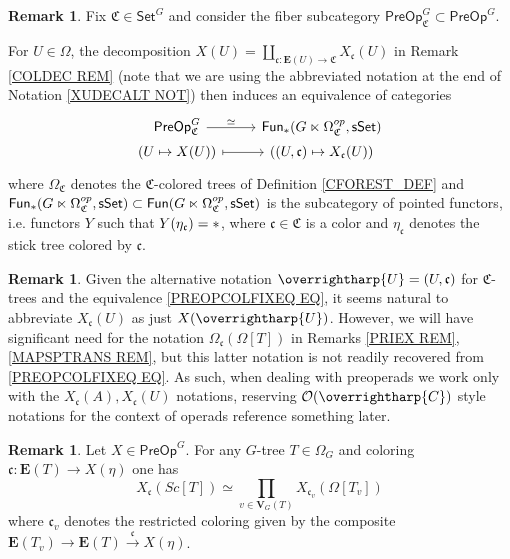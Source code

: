 \documentclass[a4paper,10pt
,draft
]{article}%
\numberwithin{equation}{section}
\numberwithin{figure}{section}
\theoremstyle{definition} %
\newtheorem{remark}[equation]{Remark}%
\newcommand{\vect}[1]{\text{\overrightharp{\ensuremath{#1}}}}
\renewcommand{\O}{\ensuremath{\mathcal O}}
\newcommand{\1}{\ensuremath{\mathbbm 1}}%
\begin{document}
\begin{remark}
	Fix $\mathfrak{C} \in \mathsf{Set}^G$
	and consider the fiber subcategory 
	$\mathsf{PreOp}^G_{\mathfrak{C}} \subset \mathsf{PreOp}^G$.
	
	For $U \in \Omega$, the decomposition
	$X(U) = \coprod_{\mathfrak{c} \colon \boldsymbol{E}(U) \to \mathfrak{C}} X_{\mathfrak{c}}(U)$
	in Remark \ref{COLDEC REM}
	(note that we are using the abbreviated notation at the end of
	Notation \ref{XUDECALT NOT})
	then induces an equivalence of categories
\begin{equation}\label{PREOPCOLFIXEQ EQ}
\begin{tikzcd}[row sep = 0]
	\mathsf{PreOp}^G_{\mathfrak{C}}
	\ar{r}{\simeq}
&
	\mathsf{Fun}_{\**}(G \ltimes \Omega^{op}_{\mathfrak{C}},\mathsf{sSet})
\\
	(U \mapsto X(U))
	\ar[mapsto]{r}
&
	((U,\mathfrak{c}) \mapsto X_{\mathfrak{c}}(U))
\end{tikzcd}
\end{equation}
	where $\Omega_{\mathfrak{C}}$
	denotes the $\mathfrak{C}$-colored trees of 
	Definition \ref{CFOREST_DEF} and 
	$\mathsf{Fun}_{\**}(G \ltimes \Omega^{op}_{\mathfrak{C}},\mathsf{sSet})
	\subset
	\mathsf{Fun}(G \ltimes \Omega^{op}_{\mathfrak{C}},\mathsf{sSet})$
	is the subcategory of pointed functors,
	i.e. functors $Y$ such that
	$Y(\eta_{\mathfrak{c}}) = \**$,
	where $\mathfrak{c} \in \mathfrak{C}$ is a color
	and $\eta_{\mathfrak{c}}$ denotes the stick tree colored by $\mathfrak{c}$.
\end{remark}


\begin{remark}
	Given the alternative notation
	$\vect{U} = (U,\mathfrak{c})$
	for $\mathfrak{C}$-trees and the equivalence
	\eqref{PREOPCOLFIXEQ EQ}, 
	it seems natural to abbreviate 
	$X_{\mathfrak{c}}(U)$ as just $X(\vect{U})$.
	However, we will have significant need for the notation
	$\Omega_{\mathfrak{c}}(\Omega[T])$
	in Remarks \ref{PRIEX REM},\ref{MAPSPTRANS REM},
	but this latter notation is not readily recovered from 
	\eqref{PREOPCOLFIXEQ EQ}.
	As such, when dealing with preoperads we work only with the 
	$X_{\mathfrak{c}}(A),X_{\mathfrak{c}}(U)$
	notations,
	reserving $\O(\vect{C})$ style notations for the context of operads
	{\color{blue} reference something later}.
\end{remark}



\begin{remark}\label{SCTCOLPR REM}
	Let $X \in \mathsf{PreOp}^G$.
	For any $G$-tree $T \in \Omega_G$
	and coloring 
	$\mathfrak{c} \colon \boldsymbol{E}(T) \to X(\eta)$
	one has
	\[
	X_{\mathfrak{c}}(Sc[T]) 
	\simeq
	\prod_{v \in \boldsymbol{V}_G(T)}
	X_{\mathfrak{c}_v}(\Omega[T_v]) 
	\]
where $\mathfrak{c}_v$
denotes the restricted coloring given by the composite
$\boldsymbol{E}(T_v) \to \boldsymbol{E}(T) 
\xrightarrow{\mathfrak{c}} X(\eta)$. 
\end{remark}
\end{document}
